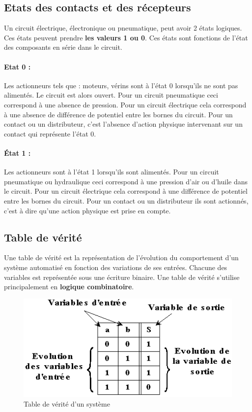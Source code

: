 \documentclass[10pt,fleqn]{article} %
\begin{document}
\subsection{Etats des contacts et des récepteurs}
Un circuit électrique, électronique ou pneumatique, peut avoir 2 états logiques. Ces états peuvent prendre \textbf{les valeurs 1 ou 0}.
Ces états sont fonctions de l'état des composants en série dans le circuit.

\paragraph{Etat 0 :}
Les actionneurs tels que : moteurs, vérins sont à l'état 0 lorsqu'ils ne sont pas alimentés. Le circuit est alors ouvert. Pour un circuit
pneumatique ceci correspond à une absence de pression. Pour un circuit électrique cela correspond à une absence de différence de
potentiel entre les bornes du circuit.
Pour un contact ou un distributeur, c'est l’absence d'action physique intervenant sur un contact qui représente l'état 0.
\paragraph{État 1 :}
Les actionneurs sont à l'état 1 lorsqu'ils sont alimentés. Pour un circuit pneumatique ou hydraulique ceci correspond à une
pression d’air ou d’huile dans le circuit. Pour un circuit électrique cela correspond à une différence de potentiel entre les bornes du
circuit.
Pour un contact ou un distributeur ils sont actionnés, c’est à dire qu'une action physique est prise en compte.



\subsection{Table de vérité}
\begin{definition}
  Une table de vérité est la représentation de l’évolution du comportement d’un système automatisé en fonction des variations de
ses entrées. Chacune des variables est représentée sous une écriture binaire. Une table de vérité s'utilise principalement en \textbf{logique
combinatoire}.
\end{definition}

\begin{figure}
    \centering
  \includegraphics[width=.5\textwidth]{images/verite}
  \caption{Table de vérité d'un système}
  \label{fig:verite}
\end{figure}
\end{document}
